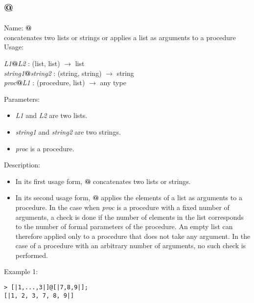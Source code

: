 \subsection{@}
\label{labconcat}
\noindent Name: \textbf{@}\\
concatenates two lists or strings or applies a list as arguments to a procedure\\
\noindent Usage: 
\begin{center}
\emph{L1}\textbf{@}\emph{L2} : (\textsf{list}, \textsf{list}) $\rightarrow$ \textsf{list}\\
\emph{string1}\textbf{@}\emph{string2} : (\textsf{string}, \textsf{string}) $\rightarrow$ \textsf{string}\\
\emph{proc}\textbf{@}\emph{L1} : (\textsf{procedure}, \textsf{list}) $\rightarrow$ \textsf{any type}\\
\end{center}
Parameters: 
\begin{itemize}
\item \emph{L1} and \emph{L2} are two lists.
\item \emph{string1} and \emph{string2} are two strings.
\item \emph{proc} is a procedure.
\end{itemize}
\noindent Description: \begin{itemize}

\item In its first usage form, \textbf{@} concatenates two lists or strings.

\item In its second usage form, \textbf{@} applies the elements of a list as
   arguments to a procedure. In the case when \emph{proc} is a procedure 
   with a fixed number of arguments, a check is done if the number of
   elements in the list corresponds to the number of formal parameters
   of the procedure. An empty list can therefore applied only to a 
   procedure that does not take any argument. In the case of a 
   procedure with an arbitrary number of arguments, no such check is 
   performed.
\end{itemize}
\noindent Example 1: 
\begin{center}\begin{minipage}{15cm}\begin{Verbatim}[frame=single]
> [|1,...,3|]@[|7,8,9|];
[|1, 2, 3, 7, 8, 9|]
\end{Verbatim}
\end{minipage}\end{center}
